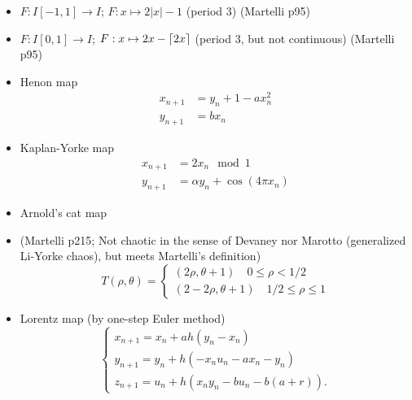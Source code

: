 \documentclass[11pt]{book}
\begin{document}
\begin{itemize}
  \item $F: I [-1,1] \to I$; $F: x \mapsto 2|x| - 1$ (period 3) (Martelli p95)
  \item $F: I [0,1] \to I$; $F: x \mapsto 2x - \lceil2x\rceil$ (period 3, but not continuous) (Martelli p95)
  \item Henon map
    \begin{align*}
      x_{n+1} &= y_n + 1 - ax_n^2 \\
      y_{n+1} &= bx_n
    \end{align*}
  \item Kaplan-Yorke map
    \begin{align*}
      x_{n+1} &= 2x_n \mod 1    \\
      y_{n+1} &= \alpha y_n + \cos(4\pi x_n)
    \end{align*}
  \item Arnold's cat map
  \item (Martelli p215; Not chaotic in the sense of Devaney nor Marotto (generalized Li-Yorke chaos), 
    but meets Martelli's definition)
    \begin{equation*}
      T(\rho, \theta) =
      \begin{cases}
        (2\rho, \theta + 1) \quad 0\leq \rho < 1/2 \\
        (2 - 2\rho, \theta + 1) \quad 1/2 \leq \rho \leq 1
      \end{cases}
    \end{equation*}
  \item Lorentz map (by one-step Euler method)
    \begin{equation*}
      \begin{cases}
        x_{n+1} = x_n + ah(y_n - x_n) \\
        y_{n+1} = y_n + h(-x_nu_n - ax_n - y_n) \\
        z_{n+1} = u_n + h(x_ny_n - bu_n - b(a+r)).
      \end{cases}
    \end{equation*}

\end{itemize}
\end{document}
